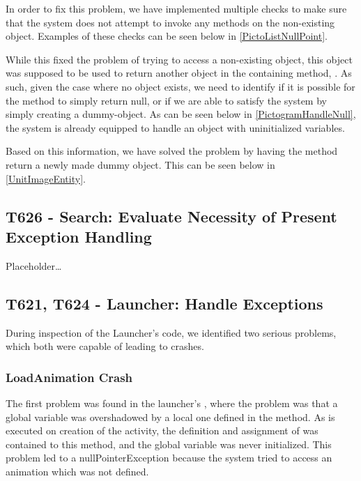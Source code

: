 In order to fix this problem, we have implemented multiple checks to make sure
that the system does not attempt to invoke any methods on the non-existing
object. Examples of these checks can be seen below in
\autoref{PictoListNullPoint}.

 
While this fixed the problem of trying to access a non-existing object, this
object was supposed to be used to return another object in the containing
method, .
As such, given the case where no object exists, we need to identify if it is
possible for the method to simply return null, or if we are able to satisfy the
system by simply creating a dummy-object. As can be seen below in
\autoref{PictogramHandleNull}, the system is already equipped to handle an
object with uninitialized variables.


Based on this information, we have solved the problem by having the
 method return a newly made dummy object. This can be seen below
in \autoref{UnitImageEntity}.


\subsection{T626 - Search: Evaluate Necessity of Present Exception Handling}
Placeholder\ldots

\subsection{T621, T624 - Launcher: Handle Exceptions}
During inspection of the Launcher's code, we identified two serious problems,
which both were capable of leading to crashes.

\subsubsection{LoadAnimation Crash}
The first problem was found in the launcher's , where the
problem was that a global variable  was overshadowed by a
local one defined in the  method. As  is
executed on creation of the activity, the definition and assignment of
 was contained to this method, and the global variable was
never initialized. This problem led to a nullPointerException because the system
tried to access an animation which was not defined.\nl

